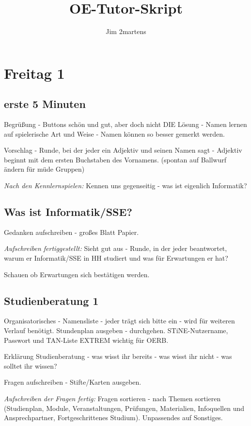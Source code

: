 \documentclass[10pt,a4paper,oneside,ngerman,numbers=noenddot]{scrartcl}
\begin{document}
\author{Jim 2martens}
\title{OE-Tutor-Skript}
\maketitle

\tableofcontents

\section{Freitag 1}

	\subsection{erste 5 Minuten}
	Begrüßung - Buttons schön und gut, aber doch nicht DIE Lösung - Namen lernen auf spielerische Art und Weise - Namen können so besser gemerkt werden.
	
	Vorschlag - Runde,  bei der jeder ein Adjektiv und seinen Namen sagt - Adjektiv beginnt mit dem ersten Buchstaben des Vornamens. (spontan auf Ballwurf ändern für müde Gruppen)
	
	\textit{Nach den Kennlernspielen:} Kennen uns gegenseitig - was ist eigenlich Informatik?
	
	\subsection{Was ist Informatik/SSE?}
	
	Gedanken aufschreiben - großes Blatt Papier. 
	
	\textit{Aufschreiben fertiggestellt:} Sieht gut aus - Runde, in der jeder beantwortet, warum er Informatik/SSE in HH studiert und was für Erwartungen er hat?
	
	Schauen ob Erwartungen sich bestätigen werden. 
	
	\subsection{Studienberatung 1}
	
	Organisatorisches - Namensliste - jeder trägt sich bitte ein - wird für weiteren Verlauf benötigt. Stundenplan ausgeben - durchgehen. STiNE-Nutzername, Passwort und TAN-Liste EXTREM wichtig für OERB.
	
	Erklärung Studienberatung - was wisst ihr bereits - was wisst ihr nicht - was solltet ihr wissen?
	
	Fragen aufschreiben - Stifte/Karten ausgeben.
	
	\textit{Aufschreiben der Fragen fertig:} Fragen sortieren - nach Themen sortieren (Studienplan, Module, Veranstaltungen, Prüfungen, Materialien, Infoquellen und Ansprechpartner, Fortgeschrittenes Studium). Unpassendes auf Sonstiges.
	
\end{document}
